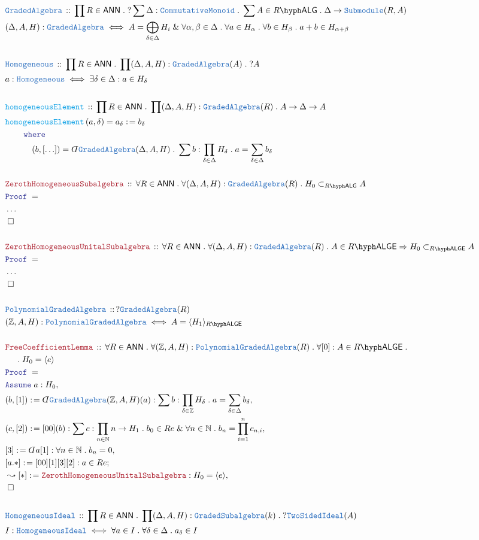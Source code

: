 \documentclass[12pt]{scrartcl}%
\newcommand{\TYPE}[1]{\textcolor{NavyBlue}{\mathtt{#1}}}%
\newcommand{\FUNC}[1]{\textcolor{Cerulean}{\mathtt{#1}}}%
\newcommand{\LOGIC}[1]{\textcolor{Blue}{\mathtt{#1}}}%
\newcommand{\THM}[1]{\textcolor{Maroon}{\mathtt{#1}}}%
\renewcommand{\.}{\; . \;} %
\newcommand{\de}{: \kern 0.1pc =} %
\newcommand{\where}{\LOGIC{where}} %
\newcommand{\Act}[1]{\left( #1 \right)} %
\newcommand{\Theorem}[2]{& \THM{#1} \, :: \, #2 \\ & \Proof = \\ } %
\newcommand{\DeclareType}[2]{& \TYPE{#1} \, :: \, #2 \\}%
\newcommand{\DefineType}[3]{& #1 : \TYPE{#2} \iff #3 \\}%
\newcommand{\DeclareFunc}[2]{& \FUNC{#1} \, :: \, #2 \\}%
\newcommand{\DefineNamedFunc}[4]{&  \FUNC{#1}\Act{#2} = #3 \de #4 \\}%
\newcommand{\NewLine}{\\ & \kern 1pc}%
\newcommand{\Page}[1]{ \begin{align*} #1 \end{align*}  }%
\newcommand{ \bd }{ \ByDef }%
\newcommand{\NoProof}{ & \ldots \\ \EndProof}%
\renewcommand{\And}{\; \& \;}%
\newcommand{\Int}{\mathbb{Z}}%
\newcommand{\Nat}{\mathbb{N}}%
\newcommand{\Say}[3]{& #1 \de #2 : #3, \\} %
\newcommand{\Conclude}[3]{& #1 \de #2 : #3; \\}%
\newcommand{\Derive}[3]{& \leadsto #1 \de #2 : #3, \\} %
\newcommand{\Assume}[2]{& \LOGIC{Assume} \; #1 : #2, \\} %
\newcommand{\QED}{\; \square} %
\newcommand{\EndProof}{& \QED \\} %
\newcommand{\ByDef}{\rotatebox[origin=c]{-180}{$D$}}%
\newcommand{\Proof}{\LOGIC{Proof} \; } %
\newcommand{\ANN}{\mathsf{ANN}} %
\newcommand{\LALG}[1]{#1\hyph\mathsf{ALG}}%
\newcommand{\LALGE}[1]{#1\hyph\mathsf{ALGE}}%
\newcommand{\PGA}{\TYPE{PolynomialGradedAlgebra}}
\begin{document}
\Page{
	\DeclareType{GradedAlgebra}{\prod R \in \ANN \. ? \sum \Delta : \TYPE{CommutativeMonoid} \. \sum A \in \LALG{R} \. \Delta \to \TYPE{Submodule}(R,A)}
	\DefineType{(\Delta,A,H)}{GradedAlgebra}{A = \bigoplus_{\delta \in \Delta} H_i \And \forall \alpha,\beta \in \Delta \. \forall a \in H_\alpha \. \forall b \in H_\beta \. a + b \in H_{\alpha + \beta} }
	\\
	\DeclareType{Homogeneous}{\prod R \in \ANN \. \prod (\Delta,A,H) : \TYPE{GradedAlgebra}(A) \. ?A}
	\DefineType{a}{Homogeneous}{\exists \delta \in \Delta : a \in H_\delta}
	\\
	\DeclareFunc{homogeneousElement}{\prod R \in \ANN \. \prod (\Delta,A,H) : \TYPE{GradedAlgebra}(R) \. A \to \Delta \to A}
	\DefineNamedFunc{homogeneousElement}{a,\delta}{a_\delta}{b_\delta \NewLine \quad \where \NewLine 
		\quad \quad (b,[\ldots]) = \bd\TYPE{GradedAlgebra}(\Delta,A,H) \. \sum b : \prod_{\delta \in \Delta} H_\delta \. a = \sum_{\delta \in \Delta} b_\delta}
	\\
	\Theorem{ZerothHomogeneousSubalgebra}{\forall R \in \ANN \. \forall (\Delta,A,H) : \TYPE{GradedAlgebra}(R) \. H_0 \subset_{\LALG{R}} A}
	\NoProof
	\\
	\Theorem{ZerothHomogeneousUnitalSubalgebra}{\forall R \in \ANN \. \forall (\Delta,A,H) : \TYPE{GradedAlgebra}(R) \. A \in \LALGE{R} \Rightarrow  H_0 \subset_{\LALGE{R}} A}
	\NoProof
	\\
	\DeclareType{\PGA}{?\TYPE{GradedAlgebra}(R)}
	\DefineType{(\Int,A,H)}{\PGA}{ A = \langle H_1 \rangle_{\LALGE{R}} }
	\\
	\Theorem{FreeCoefficientLemma}{
		\forall R \in \ANN \. 
		\forall (\Int,A,H) : \PGA(R) \. 
		\forall [0] : A \in \LALGE{R} \. \NewLine \.  
		H_0 = \langle e \rangle 
	}
	\Assume{a}{H_0}
	\Say{(b,[1])}{\bd \TYPE{GradedAlgebra}(\Int,A,H)(a)}{\sum b : \prod_{\delta \in \Int} H_\delta \. a = \sum_{\delta \in \Delta} b_\delta} 
	\Say{(c,[2])}{[00](b)}{\sum c : \prod_{n \in \Nat}  n \to H_1 \. b_0 \in Re \And \forall n \in \Nat \. b_n = \prod^n_{i=1} c_{n,i} }
	\Say{[3]}{\bd a [1]}{ \forall n \in \Nat \. b_n = 0}
	\Conclude{[a.*]}{[00][1][3][2]}{  a \in Re}
	\Derive{[*]}{ \THM{ZerothHomogeneousUnitalSubalgebra}  }{H_0 = \langle e \rangle}
	\EndProof
	\\
	\DeclareType{HomogeneousIdeal}{\prod R \in \ANN \. \prod (\Delta,A,H) : \TYPE{GradedSubalgebra}(k) \. ?\TYPE{TwoSidedIdeal}(A) }
	\DefineType{I}{HomogeneousIdeal}{\forall a \in I \. \forall \delta \in \Delta \. a_\delta \in I }
}
\end{document}
